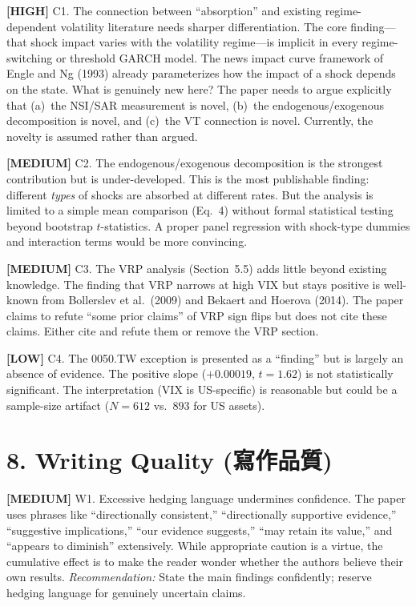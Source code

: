 \documentclass[12pt,a4paper]{article}
\newcommand{\high}[1]{\textcolor{errorred}{\textbf{[HIGH]} #1}}
\newcommand{\med}[1]{\textcolor{warncolor}{\textbf{[MEDIUM]} #1}}
\newcommand{\low}[1]{\textcolor{okgreen}{\textbf{[LOW]} #1}}
\begin{document}
\high{C1. The connection between ``absorption'' and existing regime-dependent volatility literature needs sharper differentiation.} The core finding---that shock impact varies with the volatility regime---is implicit in every regime-switching or threshold GARCH model. The news impact curve framework of Engle and Ng (1993) already parameterizes how the impact of a shock depends on the state. What is genuinely new here? The paper needs to argue explicitly that (a)~the NSI/SAR measurement is novel, (b)~the endogenous/exogenous decomposition is novel, and (c)~the VT connection is novel. Currently, the novelty is assumed rather than argued.

\med{C2. The endogenous/exogenous decomposition is the strongest contribution but is under-developed.} This is the most publishable finding: different \emph{types} of shocks are absorbed at different rates. But the analysis is limited to a simple mean comparison (Eq.~4) without formal statistical testing beyond bootstrap $t$-statistics. A proper panel regression with shock-type dummies and interaction terms would be more convincing.

\med{C3. The VRP analysis (Section~5.5) adds little beyond existing knowledge.} The finding that VRP narrows at high VIX but stays positive is well-known from Bollerslev et al.\ (2009) and Bekaert and Hoerova (2014). The paper claims to refute ``some prior claims'' of VRP sign flips but does not cite these claims. Either cite and refute them or remove the VRP section.

\low{C4. The 0050.TW exception is presented as a ``finding'' but is largely an absence of evidence.} The positive slope ($+0.00019$, $t = 1.62$) is not statistically significant. The interpretation (VIX is US-specific) is reasonable but could be a sample-size artifact ($N = 612$ vs.\ $893$ for US assets).

\section*{8. Writing Quality (寫作品質)}

\med{W1. Excessive hedging language undermines confidence.} The paper uses phrases like ``directionally consistent,'' ``directionally supportive evidence,'' ``suggestive implications,'' ``our evidence suggests,'' ``may retain its value,'' and ``appears to diminish'' extensively. While appropriate caution is a virtue, the cumulative effect is to make the reader wonder whether the authors believe their own results. \emph{Recommendation:} State the main findings confidently; reserve hedging language for genuinely uncertain claims.
\end{document}
